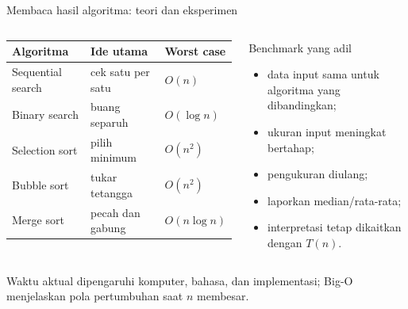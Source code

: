 \documentclass[aspectratio=169,11pt]{beamer}
\begin{document}
\begin{frame}{Membaca hasil algoritma: teori dan eksperimen}
\begin{columns}[T]
\begin{table}
\small
\begin{tabular}{lll}
\toprule
Algoritma & Ide utama & Worst case\\
\midrule
Sequential search & cek satu per satu & $O(n)$\\
Binary search & buang separuh & $O(\log n)$\\
Selection sort & pilih minimum & $O(n^2)$\\
Bubble sort & tukar tetangga & $O(n^2)$\\
Merge sort & pecah dan gabung & $O(n\log n)$\\
\bottomrule
\end{tabular}
\end{table}
\begin{block}{Benchmark yang adil}
\begin{itemize}
\item data input sama untuk algoritma yang dibandingkan;
\item ukuran input meningkat bertahap;
\item pengukuran diulang;
\item laporkan median/rata-rata;
\item interpretasi tetap dikaitkan dengan $T(n)$.
\end{itemize}
\end{block}
\end{columns}
\vspace{1mm}
\small Waktu aktual dipengaruhi komputer, bahasa, dan implementasi; Big-O menjelaskan pola pertumbuhan saat $n$ membesar.
\end{frame}
\end{document}
